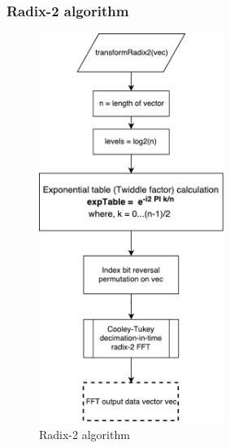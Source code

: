 \newpage
\subsubsection{Radix-2 algorithm}
\begin{figure}[h]
	\centering
	\includegraphics[width=6cm]{./algorithms/fft/figures/Radix2.pdf}
	\caption{Radix-2 algorithm}\label{Radix-2}
\end{figure}

\newpage
